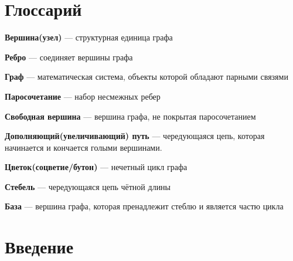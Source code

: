 \documentclass[14pt, a4paper]{extarticle}
\begin{document}
    
    
    \vspace{1cm}
   
    \pagebreak
   
    \tableofcontents
   
    \pagebreak

    \section*{Глоссарий}

    \textbf{Вершина(узел)} --- структурная единица графа

    \textbf{Ребро} --- соединяет вершины графа
    
    \textbf{Граф} --- математическая система, объекты которой обладают парными связями

    \textbf{Паросочетание} --- набор несмежных ребер

    \textbf{Свободная вершина} --- вершина графа, не покрытая паросочетанием

    \textbf{Дополняющий(увеличивающий) путь} --- чередующаяся цепь, которая начинается и кончается голыми вершинами.

    \textbf{Цветок(соцветие/бутон)} --- нечетный цикл графа

    \textbf{Стебель} --- чередующаяся цепь чётной длины

    \textbf{База} --- вершина графа, которая пренадлежит стеблю и  является частю цикла

    \pagebreak
   
    \section*{Введение}
   
   
   
\end{document}

